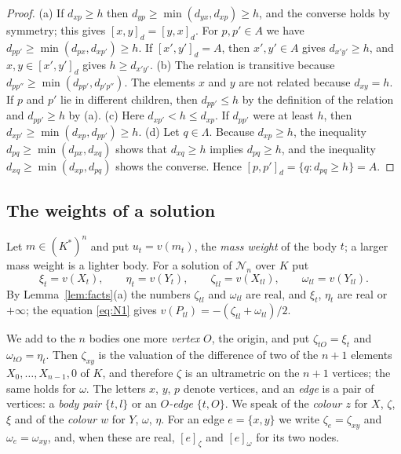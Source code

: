 \documentclass[11pt]{amsart}
\theoremstyle{definition}
\theoremstyle{remark}
\numberwithin{equation}{section}
\newcommand{\cN}{\mathcal{N}}
\newcommand{\nd}[2]{[#1]_{#2}}
\begin{document}
\begin{proof}
(a) If $d_{xp} \ge h$ then $d_{yp} \ge \min(d_{yx}, d_{xp}) \ge h$, and the converse holds by symmetry;
this gives $\nd{x, y}{d} = \nd{y, x}{d}$. For $p, p' \in A$ we have
$d_{pp'} \ge \min(d_{px}, d_{xp'}) \ge h$. If $\nd{x', y'}{d} = A$, then $x', y' \in A$ gives
$d_{x'y'} \ge h$, and $x, y \in \nd{x', y'}{d}$ gives $h \ge d_{x'y'}$. (b) The relation is transitive
because $d_{pp''} \ge \min(d_{pp'}, d_{p'p''})$. The elements $x$ and $y$ are not related because
$d_{xy} = h$. If $p$ and $p'$ lie in different children, then $d_{pp'} \le h$ by the definition of the
relation and $d_{pp'} \ge h$ by (a). (c) Here $d_{xp'} < h \le d_{xp}$. If $d_{pp'}$ were at least $h$,
then $d_{xp'} \ge \min(d_{xp}, d_{pp'}) \ge h$. (d) Let $q \in \Lambda$. Because
$d_{xp} \ge h$, the inequality $d_{pq} \ge \min(d_{px}, d_{xq})$ shows that $d_{xq} \ge h$ implies
$d_{pq} \ge h$, and the inequality $d_{xq} \ge \min(d_{xp}, d_{pq})$ shows the converse. Hence
$\nd{p, p'}{d} = \{ q : d_{pq} \ge h \} = A$.
\end{proof}

\subsection{The weights of a solution} Let $m \in (K^{*})^n$ and put $u_t = v(m_t)$, the \emph{mass
weight} of the body $t$; a larger mass weight is a lighter body. For a solution of $\cN_n$ over $K$ put
\[
  \xi_t = v(X_t), \qquad \eta_t = v(Y_t), \qquad \zeta_{tl} = v(X_{tl}), \qquad \omega_{tl} = v(Y_{tl}).
\]
By Lemma~\ref{lem:facts}(a) the numbers $\zeta_{tl}$ and $\omega_{tl}$ are real, and $\xi_t$, $\eta_t$
are real or $+\infty$; the equation \eqref{eq:N1} gives $v(P_{tl}) = -(\zeta_{tl} + \omega_{tl})/2$.

We add to the $n$ bodies one more \emph{vertex} $O$, the origin, and put $\zeta_{tO} = \xi_t$ and
$\omega_{tO} = \eta_t$. Then $\zeta_{xy}$ is the valuation of the difference of two of the $n + 1$
elements $X_0, \dots, X_{n-1}, 0$ of $K$, and therefore $\zeta$ is an ultrametric on the $n + 1$
vertices; the same holds for $\omega$. The letters $x$, $y$, $p$ denote vertices, and an \emph{edge} is
a pair of vertices: a \emph{body pair} $\{t, l\}$ or an \emph{$O$-edge} $\{t, O\}$. We speak of the
\emph{colour $z$} for $X$, $\zeta$, $\xi$ and of the \emph{colour $w$} for $Y$, $\omega$, $\eta$. For an
edge $e = \{x, y\}$ we write $\zeta_e = \zeta_{xy}$ and $\omega_e = \omega_{xy}$, and, when these are
real, $\nd{e}{\zeta}$ and $\nd{e}{\omega}$ for its two nodes.
\end{document}
